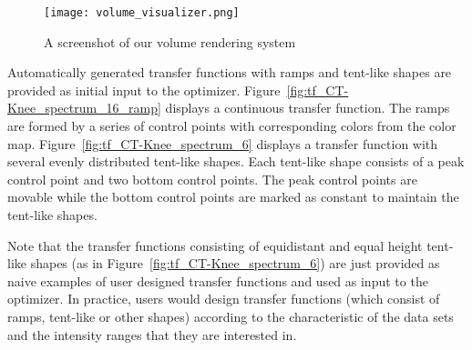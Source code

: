\begin{figure}
    \centering
	\begin{minipage}{.9\textwidth}
        \centering
        \texttt{[image: volume\_visualizer.png]}
        \caption{A screenshot of our volume rendering system}
        \label{fig:volume_visualizer}
	\end{minipage}
\end{figure}

Automatically generated transfer functions with ramps and tent-like shapes are provided as initial input to the optimizer. Figure~\ref{fig:tf_CT-Knee_spectrum_16_ramp} displays a continuous transfer function. The ramps are formed by a series of control points with corresponding colors from the color map.
Figure~\ref{fig:tf_CT-Knee_spectrum_6} displays a transfer function with several evenly distributed tent-like shapes. Each tent-like shape consists of a peak control point and two bottom control points. The peak control points are movable while the bottom control points are marked as constant to maintain the tent-like shapes.

Note that the transfer functions consisting of equidistant and equal height tent-like shapes (as in Figure~\ref{fig:tf_CT-Knee_spectrum_6}) are just provided as naive examples of user designed transfer functions and used as input to the optimizer. In practice, users would design transfer functions (which consist of ramps, tent-like or other shapes) according to the characteristic of the data sets and the intensity ranges that they are interested in.


